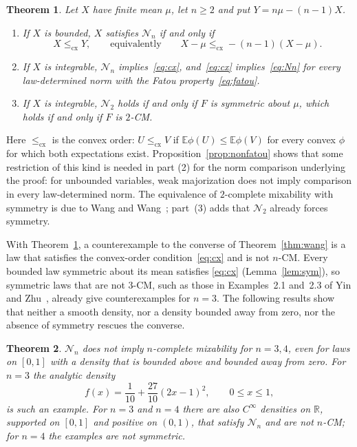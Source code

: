 \documentclass[11pt]{amsart}
\newtheorem{theorem}{Theorem}[section]
\theoremstyle{definition}
\newcommand{\E}{\mathbb{E}}
\newcommand{\R}{\mathbb{R}}
\newcommand{\cx}{\le_{\mathrm{cx}}}
\newcommand{\cN}{\mathcal{N}}
\begin{document}
\begin{theorem}\label{thm:A}
Let $X$ have finite mean $\mu$, let $n\ge2$ and put $Y=n\mu-(n-1)X$.
\begin{enumerate}
\item If $X$ is bounded, $X$ satisfies $\cN_n$ if and only if
\begin{equation}\label{eq:cx}
X\cx Y,\qquad\text{equivalently}\qquad X-\mu\cx-(n-1)(X-\mu).
\end{equation}
\item If $X$ is integrable, $\cN_n$ implies~\eqref{eq:cx}, and~\eqref{eq:cx} implies~\eqref{eq:Nn} for every
law-determined norm with the Fatou property~\eqref{eq:fatou}.
\item If $X$ is integrable, $\cN_2$ holds if and only if $F$ is symmetric about $\mu$, which holds if and only if $F$
is $2$-CM.
\end{enumerate}
\end{theorem}

Here $\cx$ is the convex order: $U\cx V$ if $\E\phi(U)\le\E\phi(V)$ for every convex $\phi$ for which both
expectations exist. Proposition~\ref{prop:nonfatou} shows that some restriction of this kind is needed in part (2)
for the norm comparison underlying the proof: for unbounded variables, weak majorization does not imply comparison
in every law-determined norm. The equivalence of $2$-complete mixability with symmetry is due to Wang and
Wang~\cite[Proposition~2.3]{WW11}; part~(3) adds that $\cN_2$ already forces symmetry.

With Theorem~\ref{thm:A}, a counterexample to the converse of Theorem~\ref{thm:wang} is a law that satisfies the
convex-order condition~\eqref{eq:cx} and is not $n$-CM. Every bounded law symmetric about its mean satisfies
\eqref{eq:cx} (Lemma~\ref{lem:sym}), so symmetric laws that are not $3$-CM, such as those in Examples~2.1 and~2.3 of
Yin and Zhu~\cite{YZ}, already give counterexamples for $n=3$. The following results show that neither a smooth
density, nor a density bounded away from zero, nor the absence of symmetry rescues the converse.

\begin{theorem}\label{thm:B}
$\cN_n$ does not imply $n$-complete mixability for $n=3,4$, even for laws on $[0,1]$ with a density that is bounded
above and bounded away from zero. For $n=3$ the analytic density
\begin{equation}\label{eq:poly}
f(x)=\frac1{10}+\frac{27}{10}(2x-1)^2,\qquad0\le x\le1,
\end{equation}
is such an example. For $n=3$ and $n=4$ there are also $C^\infty$ densities on $\R$, supported on $[0,1]$ and positive on
$(0,1)$, that satisfy $\cN_n$ and are not $n$-CM; for $n=4$ the examples are not symmetric.
\end{theorem}
\end{document}
